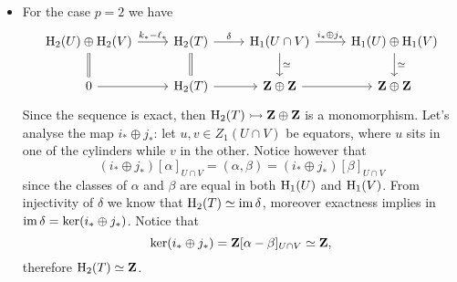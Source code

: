 \begin{example}[Torus]
\begin{enumerate}[(a)]
\begin{itemize}
                  \item For the case \(p = 2\) we have
                        \[
                            \begin{tikzcd}
                                \Hmlg_2(U) \oplus \Hmlg_2(V)
                                \ar[r, "k_{*} - \ell_{*}"]
                                \ar[d, equals]
                                &\Hmlg_2(T)
                                \ar[r, "\delta"]
                                \ar[d, equals]
                                &\Hmlg_1(U \cap V)
                                \ar[d, "\dis"]
                                \ar[r, "i_{*} \oplus j_{*}"]
                                &\Hmlg_1(U) \oplus \Hmlg_1(V)
                                \ar[d, "\dis"]
                                \\
                                0 \ar[r] &\Hmlg_2(T) \ar[r] &\Z \oplus \Z \ar[r] &\Z \oplus \Z
                            \end{tikzcd}
                        \]
                        Since the sequence is exact, then \(\operatorname{H}_2(T) \rightarrowtail \mathbf{Z} \oplus \mathbf{Z}\) is a
                        monomorphism. Let's analyse the map \(i_{*} \oplus j_{*}\): let
                        \(u, v \in Z_1(U \cap V)\) be equators, where \(u\) sits in one of the cylinders
                        while \(v\) in the other. Notice however that
                        \[
                            (i_{*} \oplus j_{*})[\alpha]_{U \cap V} = (\alpha, \beta) = (i_{*} \oplus j_{*})[\beta]_{U \cap V}
                        \]
                        since the classes of \(\alpha\) and \(\beta\) are equal in both \(\operatorname{H}_1(U)\) and
                        \(\operatorname{H}_1(V)\). From injectivity of \(\delta\) we know that
                        \(\operatorname{H}_2(T) \simeq \operatorname{im} \delta\), moreover exactness implies in
                        \(\operatorname{im} \delta = \ker(i_{*} \oplus j_{*})\). Notice that
                        \[
                            \ker(i_{*} \oplus j_{*}) = \mathbf{Z}[\alpha - \beta]_{U \cap V} \simeq \mathbf{Z},
                        \]
                        therefore \(\operatorname{H}_2(T) \simeq \mathbf{Z}\).


\end{itemize}
\end{enumerate}
\end{example}
